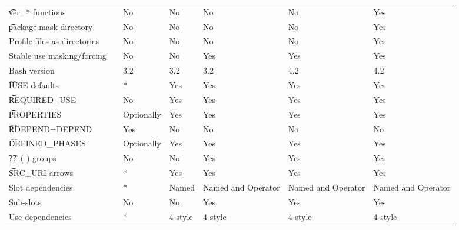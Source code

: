 \begin{landscape}
\begin{longtable}{llP{7.5em}P{7.5em}P{7.5em}P{7.5em}P{7.5em}}
\t{ver_*} functions &  &
    No & No & No & No & Yes \\

\t{package.mask} directory &  &
    No & No & No & No & Yes \\

Profile files as directories &  &
    No & No & No & No & Yes \\

Stable use masking/forcing &  &
    No & No & Yes & Yes & Yes \\

Bash version &  &
    3.2 & 3.2 & 3.2 & 4.2 & 4.2 \\

\t{IUSE} defaults &  &
    * & Yes & Yes & Yes & Yes \\

\t{REQUIRED_USE} &  &
    No & Yes & Yes & Yes & Yes \\

\t{PROPERTIES} &  &
    Optionally & Yes & Yes & Yes & Yes \\

\t{RDEPEND=DEPEND} &  &
    Yes & No & No & No & No \\

\t{DEFINED_PHASES} &  &
    Optionally & Yes & Yes & Yes & Yes \\

\t{??\ ( )} groups &  &
    No & No & Yes & Yes & Yes \\

\t{SRC_URI} arrows &  &
    * & Yes & Yes & Yes & Yes \\

Slot dependencies &  &
    * & Named & Named and Operator & Named and Operator & Named and Operator \\

Sub-slots &  &
    No & No & Yes & Yes & Yes \\

Use dependencies &  &
    * & 4-style & 4-style & 4-style & 4-style \\


\end{longtable}
\end{landscape}
